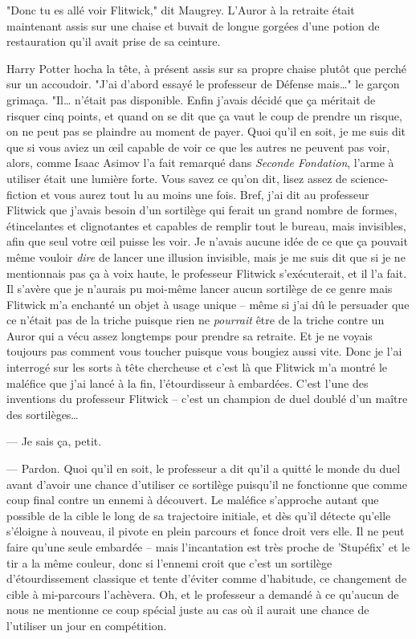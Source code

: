 \later

"Donc tu es allé voir Flitwick," dit Maugrey. L'Auror à la retraite était maintenant assis sur une chaise et buvait de longue gorgées d'une potion de restauration qu'il avait prise de sa ceinture.

Harry Potter hocha la tête, à présent assis sur sa propre chaise plutôt que perché sur un accoudoir. "J'ai d'abord essayé le professeur de Défense mais…" le garçon grimaça. "Il… n'était pas disponible. Enfin j'avais décidé que ça méritait de risquer cinq points, et quand on se dit que ça vaut le coup de prendre un risque, on ne peut pas se plaindre au moment de payer. Quoi qu'il en soit, je me suis dit que si vous aviez un œil capable de voir ce que les autres ne peuvent pas voir, alors, comme Isaac Asimov l'a fait remarqué dans \emph{Seconde Fondation}, l'arme à utiliser était une lumière forte. Vous savez ce qu'on dit, lisez assez de science-fiction et vous aurez tout lu au moins une fois. Bref, j'ai dit au professeur Flitwick que j'avais besoin d'un sortilège qui ferait un grand nombre de formes, étincelantes et clignotantes et capables de remplir tout le bureau, mais invisibles, afin que seul votre œil puisse les voir. Je n'avais aucune idée de ce que ça pouvait même vouloir \emph{dire} de lancer une illusion invisible, mais je me suis dit que si je ne mentionnais pas ça à voix haute, le professeur Flitwick s'exécuterait, et il l'a fait. Il s'avère que je n'aurais pu moi-même lancer aucun sortilège de ce genre mais Flitwick m'a enchanté un objet à usage unique -- même si j'ai dû le persuader que ce n'était pas de la triche puisque rien ne \emph{pourrait} être de la triche contre un Auror qui a vécu assez longtemps pour prendre sa retraite. Et je ne voyais toujours pas comment vous toucher puisque vous bougiez aussi vite. Donc je l'ai interrogé sur les sorts à tête chercheuse et c'est là que Flitwick m'a montré le maléfice que j'ai lancé à la fin, l'étourdisseur à embardées. C'est l'une des inventions du professeur Flitwick -- c'est un champion de duel doublé d'un maître des sortilèges…

--- Je sais ça, petit.

--- Pardon. Quoi qu'il en soit, le professeur a dit qu'il a quitté le monde du duel avant d'avoir une chance d'utiliser ce sortilège puisqu'il ne fonctionne que comme coup final contre un ennemi à découvert. Le maléfice s'approche autant que possible de la cible le long de sa trajectoire initiale, et dès qu'il détecte qu'elle s'éloigne à nouveau, il pivote en plein parcours et fonce droit vers elle. Il ne peut faire qu'une seule embardée -- mais l'incantation est très proche de 'Stupéfix' et le tir a la même couleur, donc si l'ennemi croit que c'est un sortilège d'étourdissement classique et tente d'éviter comme d'habitude, ce changement de cible à mi-parcours l'achèvera. Oh, et le professeur a demandé à ce qu'aucun de nous ne mentionne ce coup spécial juste au cas où il aurait une chance de l'utiliser un jour en compétition.

